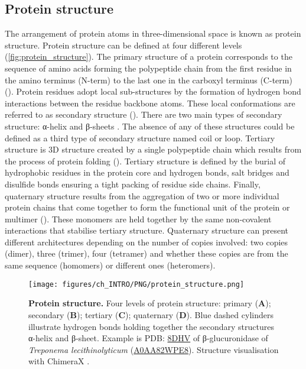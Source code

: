 \subsection{Protein structure}

The arrangement of protein atoms in three-dimensional space is known as protein structure. Protein structure can be defined at four different levels (\autoref{fig:protein_structure}). The primary structure of a protein corresponds to the sequence of amino acids forming the polypeptide chain from the first residue in the amino terminus (N-term) to the last one in the carboxyl terminus (C-term) (). Protein residues adopt local sub-structures by the formation of hydrogen bond interactions between the residue backbone atoms. These local conformations are referred to as secondary structure (). There are two main types of secondary structure: α-helix and β-sheets \cite{PAULING_1951_SS}. The absence of any of these structures could be defined as a third type of secondary structure named coil or loop. Tertiary structure is 3D structure created by a single polypeptide chain which results from the process of protein folding (). Tertiary structure is defined by the burial of hydrophobic residues in the protein core and hydrogen bonds, salt bridges and disulfide bonds ensuring a tight packing of residue side chains. Finally, quaternary structure results from the aggregation of two or more individual protein chains that come together to form the functional unit of the protein or multimer (). These monomers are held together by the same non-covalent interactions that stabilise tertiary structure. Quaternary structure can present different architectures depending on the number of copies involved: two copies (dimer), three (trimer), four (tetramer) and whether these copies are from the same sequence (homomers) or different ones (heteromers).

\begin{figure}[htb!]
    \centering
    \texttt{[image: figures/ch\_INTRO/PNG/protein\_structure.png]}
    \caption[Protein structure]{\textbf{Protein structure.} Four levels of protein structure: primary (\textbf{A}); secondary (\textbf{B}); tertiary (\textbf{C}); quaternary (\textbf{D}). Blue dashed cylinders illustrate hydrogen bonds holding together the secondary structures α-helix and β-sheet. Example is PDB: \href{https://www.ebi.ac.uk/pdbe/entry/pdb/8dhv}{8DHV} \cite{LIETZAN_2023_BETAGLUCO} of β-glucuronidase of \textit{Treponema lecithinolyticum} (\href{https://www.uniprot.org/uniprotkb/A0AA82WPE8/entry}{A0AA82WPE8}). Structure visualisation with ChimeraX \cite{PETTERSEN_2021_CHIMERAX}.}
    \label{fig:protein_structure}
\end{figure}

